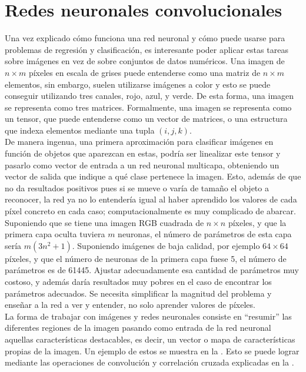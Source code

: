 \begin{itemize}
			\end{itemize}
			
		\section{Redes neuronales convolucionales}
		
			Una vez explicado cómo funciona una red neuronal y cómo puede usarse para problemas de regresión y clasificación, es interesante poder aplicar estas tareas sobre imágenes en vez de sobre conjuntos de datos numéricos. Una imagen de $n \times m$ píxeles en escala de grises puede entenderse como una matriz de $n \times m$ elementos, sin embargo, suelen utilizarse imágenes a color y esto se puede conseguir utilizando tres canales, rojo, azul, y verde. De esta forma, una imagen se representa como tres matrices. Formalmente, una imagen se representa como un tensor, que puede entenderse como un vector de matrices, o una estructura que indexa elementos mediante una tupla $(i, j, k)$.\\
			
			De manera ingenua, una primera aproximación para clasificar imágenes en función de objetos que aparezcan en estas, podría ser linealizar este tensor y pasarlo como vector de entrada a un red neuronal multicapa, obteniendo un vector de salida que indique a qué clase pertenece la imagen. Esto, además de que no da resultados positivos pues si se mueve o varía de tamaño el objeto a reconocer, la red ya no lo entendería igual al haber aprendido los valores de cada píxel concreto en cada caso; computacionalmente es muy complicado de abarcar. Suponiendo que se tiene una imagen RGB cuadrada de $n \times n$ píxeles, y que la primera capa oculta tuviera $m$ neuronas, el número de parámetros de esta capa sería $m(3n^2 + 1)$. Suponiendo imágenes de baja calidad, por ejemplo $64 \times 64$ píxeles, y que el número de neuronas de la primera capa fuese 5, el número de parámetros es de 61445. Ajustar adecuadamente esa cantidad de parámetros muy costoso, y además daría resultados muy pobres en el caso de encontrar los parámetros adecuados. Se necesita simplificar la magnitud del problema y enseñar a la red a ver y entender, no solo aprender valores de píxeles. \\
			
			La forma de trabajar con imágenes y redes neuronales consiste en ``resumir'' las diferentes regiones de la imagen pasando como entrada de la red neuronal aquellas características destacables, es decir, un vector o mapa de características propias de la imagen. Un ejemplo de estos se muestra en la . Esto se puede lograr mediante las operaciones de convolución y correlación cruzada explicadas en la . 
			
